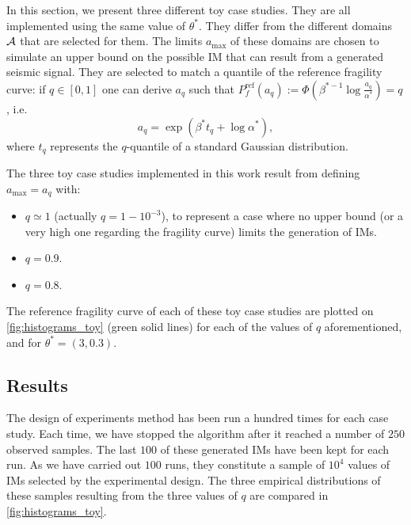     In this section, we present three different toy case studies. They are all implemented using the same value of $\theta^\ast$. 
    They differ from the different domains $\mathcal{A}$ that are selected for them.
    The limits $a_{\text{max}}$ of these domains are chosen to simulate an upper bound 
    on the possible IM that can result from a generated seismic signal.
    They are selected to match a quantile of the reference fragility curve: if $q\in[0,1]$ one can derive $a_q$ such that $P^{\text{ref}}_f(a_q):=\Phi\left(\beta^{\ast -1}\log\frac{a_q}{\alpha^{\ast}}\right)=q$, i.e.
        \begin{equation}
            a_q = \exp\left( \beta^\ast t_q+\log\alpha^\ast \right),
        \end{equation}
    where $t_q$ represents the $q$-quantile of a standard Gaussian distribution.
    
    The three toy case studies implemented in this work result from defining $a_{\text{max}}=a_q$ with:
    \begin{itemize}
        \item $q\simeq1$ (actually $q=1-10^{-3}$), to represent a case where no upper bound (or a very high one regarding the fragility curve) limits the generation of IMs. %
        \item $q=0.9$.
        \item $q=0.8$.
    \end{itemize}
    The reference fragility curve of each of these toy case studies are plotted on  \cref{fig:histograms_toy} (green solid lines) for each of the values of $q$ aforementioned, and for $\theta^\ast=(3,0.3)$. 
    
    
    
    
    
    \subsection{Results}
    
    The design of experiments method has been run a hundred times for each case study. Each time, we have stopped the algorithm after it reached a number of $250$ observed samples.
    The last $100$ of these generated IMs have been kept for each run. As we have carried out $100$ runs, they constitute a sample of $10^4$ values of IMs selected by the experimental design.
    The three empirical distributions of these samples resulting from the three values of $q$ are compared in  \cref{fig:histograms_toy}.
    
